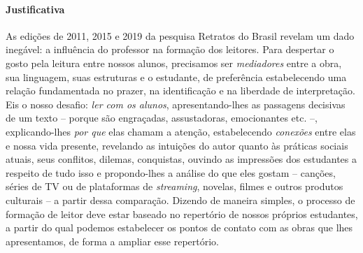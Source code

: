 \documentclass[12pt]{extarticle}
\begin{document}
\paragraph{Justificativa} As edições de 2011, 2015 e 2019 da pesquisa
Retratos do Brasil revelam um dado inegável: a influência do professor
na formação dos leitores. Para despertar o gosto pela leitura entre
nossos alunos, precisamos ser \emph{mediadores} entre a obra, sua
linguagem, suas estruturas e o estudante, de preferência estabelecendo
uma relação fundamentada no prazer, na identificação e na liberdade de
interpretação. Eis o nosso desafio: \emph{ler com os alunos},
apresentando-lhes as passagens decisivas de um texto -- porque são
engraçadas, assustadoras, emocionantes etc. --, explicando-lhes
\emph{por que} elas chamam a atenção, estabelecendo \emph{conexões}
entre elas e nossa vida presente, revelando as intuições do autor quanto
às práticas sociais atuais, seus conflitos, dilemas, conquistas, ouvindo
as impressões dos estudantes a respeito de tudo isso e propondo-lhes a
análise do que eles gostam -- canções, séries de TV ou de plataformas de
\emph{streaming}, novelas, filmes e outros produtos culturais -- a
partir dessa comparação. Dizendo de maneira simples, o processo de
formação de leitor deve estar baseado no repertório de nossos próprios
estudantes, a partir do qual podemos estabelecer os pontos de contato
com as obras que lhes apresentamos, de forma a ampliar esse repertório.
\end{document}
